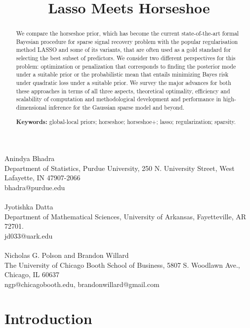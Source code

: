 \documentclass[11pt]{article}
\title{Lasso Meets Horseshoe}
\date{}
\numberwithin{equation}{section}
\begin{document}
\maketitle
\baselineskip=15pt
\begin{center}
\vspace{-1cm}
Anindya Bhadra\\
Department of Statistics, Purdue University, 250 N. University Street, West Lafayette, IN 47907-2066\\
bhadra@purdue.edu\\
\hskip 5mm \\
Jyotishka Datta\\
Department of Mathematical Sciences, University of Arkansas, Fayetteville, AR 72701.\\
jd033@uark.edu\\
\hskip 5mm \\
Nicholas G. Polson and Brandon Willard\\
The University of Chicago Booth School of Business, 5807 S. Woodlawn Ave., Chicago, IL 60637\\
ngp@chicagobooth.edu, brandonwillard@gmail.com\\
\end{center}

\begin{abstract}
\baselineskip=15pt
\noindent %
We compare the horseshoe prior, which has become the current state-of-the-art formal Bayesian procedure for sparse signal recovery problem with the popular regularisation method LASSO and some of its variants, that are often used as a gold standard for selecting the best subset of predictors. We consider two different perspectives for this problem: optimization or penalization that corresponds to finding the posterior mode under a suitable prior or the probabilistic mean that entails minimizing Bayes risk under quadratic loss under a suitable prior. We survey the major advances for both these approaches in terms of all three aspects, theoretical optimality, efficiency and scalability of computation and methodological development and performance in high-dimensional inference for the Gaussian sparse model and beyond. 


{\bf Keywords:} global-local priors; horseshoe; horseshoe+; lasso; regularization; sparsity.
\end{abstract}

\section{Introduction}
\end{document}
